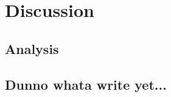 \chapter{Discussion} %

\label{chap:discussion} %



\section{Analysis}

\section{Dunno whata write yet...}